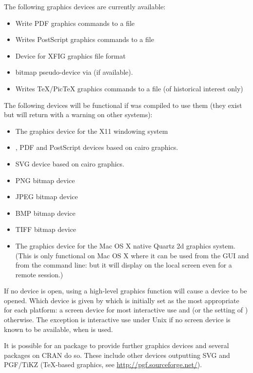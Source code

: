 \begin{Description}\relax
The following graphics devices are currently available:
\begin{itemize}

\item {} Write PDF graphics commands to a file
\item {} Writes PostScript graphics commands to
a file
\item {} Device for XFIG graphics file format
\item {} bitmap pseudo-device via
 (if available).
\item {} Writes TeX/PicTeX graphics commands to a
file (of historical interest only)

\end{itemize}

The following devices will be functional if \R{} was compiled to use
them (they exist but will return with a warning on other systems):
\begin{itemize}

\item {} The graphics device for the X11 windowing system
\item {},  PDF and PostScript
devices based on cairo graphics.
\item {} SVG device based on cairo graphics.
\item {} PNG bitmap device
\item {} JPEG bitmap device
\item {} BMP bitmap device
\item {} TIFF bitmap device

\item {} The graphics device for the Mac OS X
native Quartz 2d graphics system.  (This is only functional on Mac
OS X where it can be used from the  GUI and from the
command line: but it will display on the local screen even for a
remote session.)

\end{itemize}

\end{Description}
%
\begin{Details}\relax
If no device is open, using a high-level graphics function will cause
a device to be opened.  Which device is given by
 which is initially set as the most
appropriate for each platform: a screen device for most interactive use and
 (or the setting of )
otherwise.  The exception is interactive use under Unix if no screen
device is known to be available, when  is used.

It is possible for an \R{} package to provide further graphics devices
and several packages on CRAN do so.  These include other devices outputting
SVG and PGF/TiKZ (TeX-based graphics, see \url{http://pgf.sourceforge.net/}).
\end{Details}
